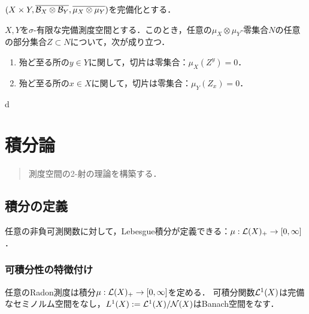 \documentclass[uplatex, dvipdfmx]{jsreport}
\begin{document}
\begin{notation}
    $(X\times Y,\overline{\mathcal{B}_X\otimes\mathcal{B}_Y},\overline{\mu_X\otimes\mu_Y})$を完備化とする．
\end{notation}

\begin{theorem}
    $X,Y$を$\sigma$-有限な完備測度空間とする．このとき，任意の$\mu_X\otimes\mu_Y$-零集合$N$の任意の部分集合$Z\subset N$について，次が成り立つ．
    \begin{enumerate}
        \item 殆ど至る所の$y\in Y$に関して，切片は零集合：$\mu_X(Z^y)=0$．
        \item 殆ど至る所の$x\in X$に関して，切片は零集合：$\mu_Y(Z_x)=0$．
    \end{enumerate}
\end{theorem}d


\chapter{積分論}

\begin{quotation}
    測度空間の2-射の理論を構築する．
\end{quotation}

\section{積分の定義}

\begin{tcolorbox}[colframe=ForestGreen, colback=ForestGreen!10!white,breakable,colbacktitle=ForestGreen!40!white,coltitle=black,fonttitle=\bfseries\sffamily,
title=]
    任意の非負可測関数に対して，Lebesgue積分が定義できる：$\mu:\mathcal{L}(X)_+\to[0,\infty]$．

\end{tcolorbox}

\subsection{可積分性の特徴付け}

\begin{tcolorbox}[colframe=ForestGreen, colback=ForestGreen!10!white,breakable,colbacktitle=ForestGreen!40!white,coltitle=black,fonttitle=\bfseries\sffamily,
title=]
    任意のRadon測度は積分$\mu:\mathcal{L}(X)_+\to[0,\infty]$を定める．
    可積分関数$\mathcal{L}^1(X)$は完備なセミノルム空間をなし，$L^1(X):=\mathcal{L}^1(X)/\mathcal{N}(X)$はBanach空間をなす．
\end{tcolorbox}
\end{document}
